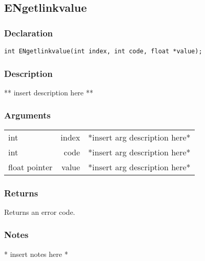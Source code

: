\subsection{ENgetlinkvalue}
\subsubsection{Declaration}
\begin{lstlisting}
int ENgetlinkvalue(int index, int code, float *value);
\end{lstlisting}
\subsubsection{Description}
** insert description here **
\subsubsection{Arguments}
\begin{tabular}{l r p{11cm} }
int&index&*insert arg description here* \\[6pt]
int&code&*insert arg description here* \\[6pt]
float pointer&value&*insert arg description here* \\[6pt]
\end{tabular}
\subsubsection{Returns}
Returns an error code.
\subsubsection{Notes}
* insert notes here *